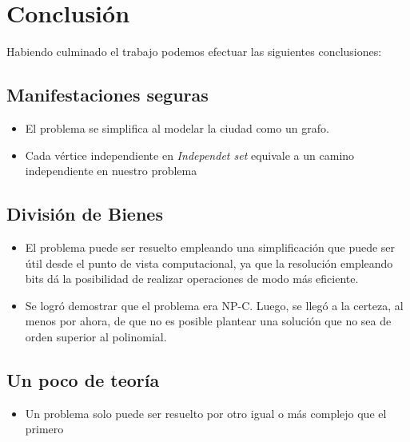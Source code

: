 \section{Conclusión}
Habiendo culminado el trabajo podemos efectuar las siguientes conclusiones:
 \subsection{Manifestaciones seguras}    
\begin{itemize}
    \item El problema se simplifica al modelar la ciudad como un grafo.
    \item Cada vértice independiente en \emph{Independet set} equivale a un camino independiente en nuestro problema
\end{itemize}
 \subsection{División de Bienes}    
\begin{itemize}
    \item El problema puede ser resuelto empleando una simplificación que puede ser útil desde el punto de vista computacional, ya que la resolución empleando bits dá la posibilidad de realizar operaciones de modo más eficiente.
    \item Se logró demostrar que el problema era NP-C. Luego, se llegó a la certeza, al menos por ahora, de que no es posible plantear una solución que no sea de orden superior al polinomial.
\end{itemize}
\subsection{Un poco de teoría}    
\begin{itemize}
    \item Un problema solo puede ser resuelto por otro igual o más complejo que el primero
\end{itemize}
